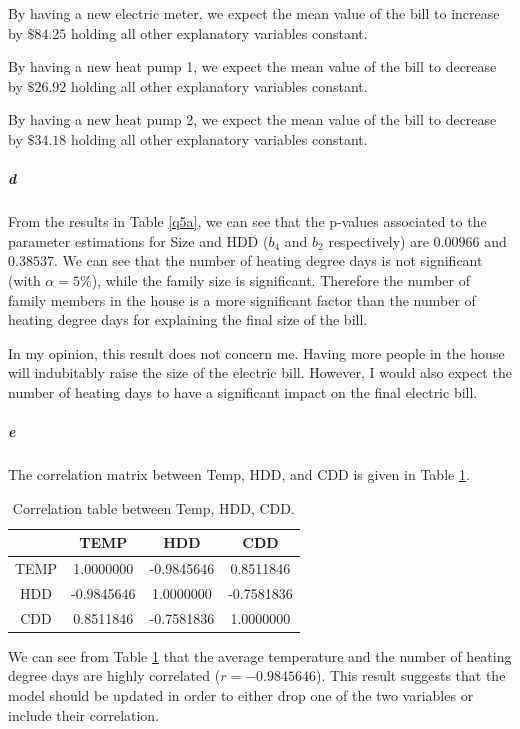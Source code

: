 \documentclass[]{article}
\let\oldsubparagraph\subparagraph
\renewcommand{\subparagraph}[1]{\oldsubparagraph{#1}\mbox{}}
\begin{document}
By having a new electric meter, we expect the mean value of the bill to increase by $\$84.25$ holding all other explanatory variables constant.

By having a new heat pump 1, we expect the mean value of the bill to decrease by $\$26.92$ holding all other explanatory variables constant.

By having a new heat pump 2, we expect the mean value of the bill to decrease by $\$34.18$ holding all other explanatory variables constant.

\subparagraph{\Large d}\normalsize

From the results in Table \ref{q5a}, we can see that the p-values associated to the parameter estimations for Size and HDD ($b_4$ and $b_2$ respectively) are $0.00966$ and $0.38537$. We can see that the number of heating degree days is not significant (with $\alpha = 5\%$), while the family size is significant. Therefore the number of family members in the house is a more significant factor than the number of heating degree days for explaining the final size of the bill. 

In my opinion, this result does not concern me. Having more people in the house will indubitably raise the size of the electric bill. However, I would also expect the number of heating days to have a significant impact on the final electric bill.

\subparagraph{\Large e}\normalsize

The correlation matrix between Temp, HDD, and CDD is given in Table \ref{q5e}.

\begin{table}[!ht]
\caption{Correlation table between Temp, HDD, CDD.}
\begin{center}
\begin{tabular}{|c|c|c|c|}
\cline{2-4}
\multicolumn{1}{c|}{} & TEMP & HDD & CDD \\
\hline
TEMP & 1.0000000& -0.9845646 & 0.8511846\\
HDD&-0.9845646 & 1.0000000& -0.7581836\\
CDD&0.8511846 &-0.7581836 & 1.0000000\\
\hline
\end{tabular}
\end{center}
\label{q5e}
\end{table}

We can see from Table \ref{q5e} that the average temperature and the number of heating degree days are highly correlated ($r = -0.9845646$). This result suggests that the model should be updated in order to either drop one of the two variables or include their correlation.
\end{document}

